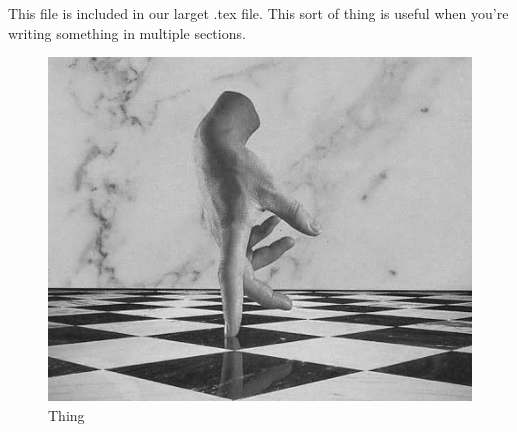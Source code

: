 This file is included in our larget .tex file. This sort of thing is useful when you're writing something in multiple sections.

\begin{figure}[h!]
  \centering
  \includegraphics[scale=0.5]{thing}
  \caption{Thing}
\end{figure}

